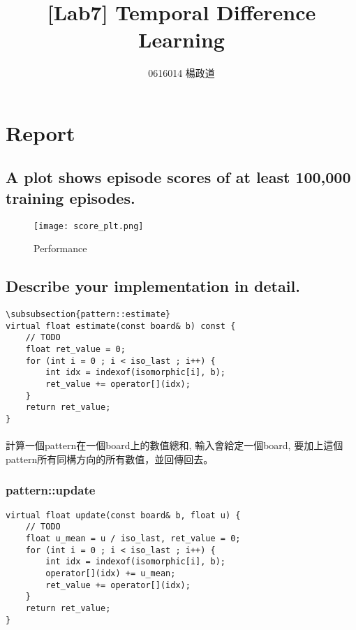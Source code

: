 \title{[Lab7] Temporal Difference Learning}
\author{0616014 楊政道}
\maketitle
\thispagestyle{fancy}
\section{Report}
\subsection{A plot shows episode scores of at least 100,000 training episodes.}
\begin{figure}[!ht]
    \begin{center}
        \texttt{[image: score\_plt.png]}
        \caption{Performance}
    \end{center}
\end{figure}
\subsection{Describe your implementation in detail.}
\begin{lstlisting}
\subsubsection{pattern::estimate}
virtual float estimate(const board& b) const {
    // TODO
    float ret_value = 0;
    for (int i = 0 ; i < iso_last ; i++) {
        int idx = indexof(isomorphic[i], b);
        ret_value += operator[](idx);
    }
    return ret_value;
}
\end{lstlisting}
\paragraph{}
計算一個pattern在一個board上的數值總和, 輸入會給定一個board, 要加上這個pattern所有同構方向的所有數值，並回傳回去。
\subsubsection{pattern::update}
\begin{lstlisting}
virtual float update(const board& b, float u) {
    // TODO
    float u_mean = u / iso_last, ret_value = 0;
    for (int i = 0 ; i < iso_last ; i++) {
        int idx = indexof(isomorphic[i], b);
        operator[](idx) += u_mean;
        ret_value += operator[](idx);
    }
    return ret_value;
}
\end{lstlisting}
